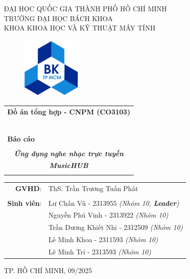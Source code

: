 \documentclass[a4paper]{article}
\begin{document}
\begin{titlepage}
\begin{center}
ĐẠI HỌC QUỐC GIA THÀNH PHỐ HỒ CHÍ MINH\\
TRƯỜNG ĐẠI HỌC BÁCH KHOA\\
KHOA KHOA HỌC VÀ KỸ THUẬT MÁY TÍNH\\
\end{center}

\vspace{1cm}

\begin{figure}[h!]
\begin{center}
\includegraphics[width=3cm]{Images/hcmut.png}
\end{center}
\end{figure}

\vspace{1cm}


\begin{center}
\begin{tabular}{c}
\multicolumn{1}{c}{\textbf{{\Large Đồ án tổng hợp - CNPM (CO3103)}}}\\
~~\\
\hline
\\
\multicolumn{1}{l}{\textbf{{\Large Báo cáo }}}\\
\\
\textbf{\textit{{\Huge Ứng dụng nghe nhạc trực tuyến}}}\vspace{5mm}\\
\textbf{\textit{{\Huge MusicHUB}}}\\
\\
\hline
\end{tabular}
\end{center}

\begin{table}[h]
\centering
    \begin{tabular}{rl}
    \hspace{3 cm}\textbf{GVHD}:
    & ThS. Trần Trương Tuấn Phát\\

    & \\[10pt]
\textbf{Sinh viên}: & Lư Chấn Vũ - 2313955 \emph{(Nhóm 10, \textbf{Leader})} \\
& Nguyễn Phú Vinh - 2313922 \emph{(Nhóm 10)} \\
& Trần Dương Khiết Nhi - 2312509 \emph{(Nhóm 10)} \\
& Lê Minh Khoa - 2311593 \emph{(Nhóm 10)} \\
& Lê Minh Trí - 2313593 \emph{(Nhóm 10)} \\
    \end{tabular}
\end{table}

\begin{center}
{\footnotesize TP. HỒ CHÍ MINH, 09/2025}
\end{center}
\end{titlepage}
\end{document}
